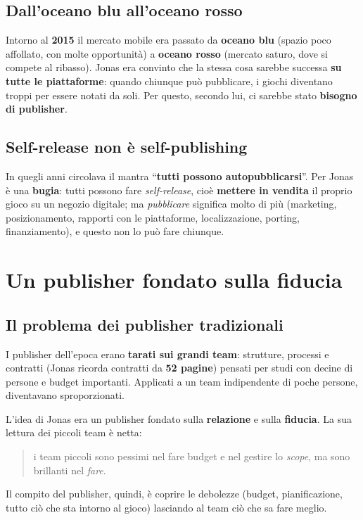 \subsection{Dall'oceano blu all'oceano rosso}

Intorno al \textbf{2015} il mercato mobile era passato da \textbf{oceano blu}
(spazio poco affollato, con molte opportunità) a \textbf{oceano rosso} (mercato
saturo, dove si compete al ribasso). Jonas era convinto che la stessa cosa sarebbe
successa \textbf{su tutte le piattaforme}: quando chiunque può pubblicare, i giochi
diventano troppi per essere notati da soli. Per questo, secondo lui, ci sarebbe
stato \textbf{bisogno di publisher}.

\subsection{Self-release non è self-publishing}

In quegli anni circolava il mantra ``\textbf{tutti possono autopubblicarsi}''.
Per Jonas è una \textbf{bugia}: tutti possono fare \emph{self-release}, cioè
\textbf{mettere in vendita} il proprio gioco su un negozio digitale; ma
\emph{pubblicare} significa molto di più (marketing, posizionamento, rapporti con
le piattaforme, localizzazione, porting, finanziamento), e questo non lo può fare
chiunque.

\section{Un publisher fondato sulla fiducia}
\label{sec:c2-5-fiducia}

\subsection{Il problema dei publisher tradizionali}

I publisher dell'epoca erano \textbf{tarati sui grandi team}: strutture, processi e
contratti (Jonas ricorda contratti da \textbf{52 pagine}) pensati per studi con
decine di persone e budget importanti. Applicati a un team indipendente di poche
persone, diventavano sproporzionati.

L'idea di Jonas era un publisher fondato sulla \textbf{relazione} e sulla
\textbf{fiducia}. La sua lettura dei piccoli team è netta:
\begin{quote}
i team piccoli sono pessimi nel fare budget e nel gestire lo \emph{scope}, ma sono
brillanti nel \emph{fare}.
\end{quote}
Il compito del publisher, quindi, è coprire le debolezze (budget, pianificazione,
tutto ciò che sta intorno al gioco) lasciando al team ciò che sa fare meglio.

